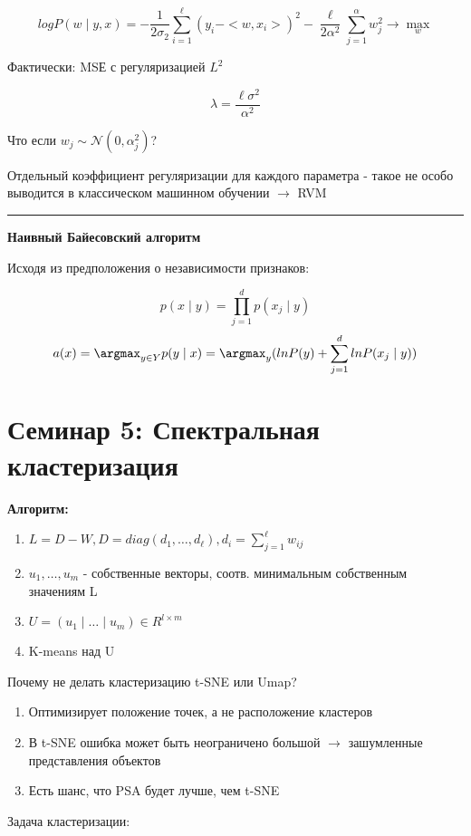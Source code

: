 \documentclass[a4paper, 12pt]{article}
\begin{document}
\[logP(w \mid y, x) = 
-\frac{1}{2\sigma_{2}}\sum_{i = 1}^{\ell}(y_i - <w, x_i>)^2 -
\frac{\ell}{2\alpha^{2}}\sum_{j = 1}^{\alpha}w_{j}^{2} 
\rightarrow \max_{w}\]

Фактически: MSЕ с регуляризацией $L^2$

\[\lambda = \frac{\ell \sigma^{2}}{\alpha^{2}}\]

Что если $w_j \sim \mathcal{N}(0, \alpha_j^2)$?

Отдельный коэффициент регуляризации для каждого
параметра - такое не особо выводится в классическом 
машинном обучении $\rightarrow$ RVM

\rule{\linewidth}{0.5pt}

\textbf{Наивный Байесовский алгоритм}

Исходя из предположения о независимости признаков:

\[p(x \mid y) = \prod_{j = 1}^{d}p(x_j \mid y)\]
\[a(x) = \argmax_{y \in Y}p(y \mid x) = 
\argmax_{y}(lnP(y) + \sum_{j = 1}^d lnP(x_j \mid y))\]

\section{Семинар 5: Спектральная кластеризация}

\textbf{Алгоритм:}

\begin{enumerate}
    \item $L = D - W, 
    D = diag(d_1, \ldots, d_{\ell}), 
    d_i = \sum_{j = 1}^{\ell}w_{ij}$
    \item $u_1, \ldots, u_m$ - собственные векторы, соотв.
    минимальным собственным значениям L
    \item $U = (u_1 \mid \ldots \mid u_m) \in R^{l \times m}$
    \item K-means над U
\end{enumerate}

Почему не делать кластеризацию t-SNE или Umap?

\begin{enumerate}
    \item Оптимизирует положение точек, 
    а не расположение кластеров
    \item В t-SNE ошибка может быть неограничено большой
    $\rightarrow$ зашумленные представления объектов
    \item Есть шанс, что PSA будет лучше, чем t-SNE
\end{enumerate}

Задача кластеризации:
\end{document}

